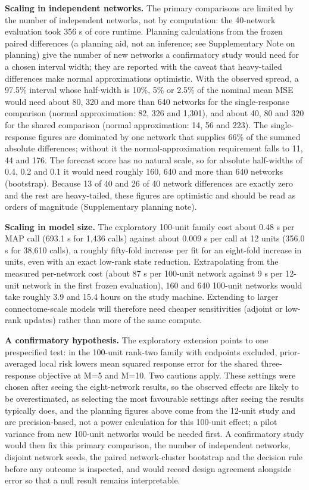 \textbf{Scaling in independent networks.} The primary comparisons are limited by the number of independent networks, not by computation: the 40-network evaluation took 356 s of core runtime. Planning calculations from the frozen paired differences (a planning aid, not an inference; see Supplementary Note on planning) give the number of new networks a confirmatory study would need for a chosen interval width; they are reported with the caveat that heavy-tailed differences make normal approximations optimistic. With the observed spread, a 97.5\% interval whose half-width is 10\%, 5\% or 2.5\% of the nominal mean MSE would need about 80, 320 and more than 640 networks for the single-response comparison (normal approximation: 82, 326 and 1,301), and about 40, 80 and 320 for the shared comparison (normal approximation: 14, 56 and 223). The single-response figures are dominated by one network that supplies 66\% of the summed absolute differences; without it the normal-approximation requirement falls to 11, 44 and 176. The forecast score has no natural scale, so for absolute half-widths of 0.4, 0.2 and 0.1 it would need roughly 160, 640 and more than 640 networks (bootstrap). Because 13 of 40 and 26 of 40 network differences are exactly zero and the rest are heavy-tailed, these figures are optimistic and should be read as orders of magnitude (Supplementary planning note).

\textbf{Scaling in model size.} The exploratory 100-unit family cost about 0.48 s per MAP call (693.1 s for 1,436 calls) against about 0.009 s per call at 12 units (356.0 s for 38,610 calls), a roughly fifty-fold increase per fit for an eight-fold increase in units, even with an exact low-rank state reduction. Extrapolating from the measured per-network cost (about 87 s per 100-unit network against 9 s per 12-unit network in the first frozen evaluation), 160 and 640 100-unit networks would take roughly 3.9 and 15.4 hours on the study machine. Extending to larger connectome-scale models will therefore need cheaper sensitivities (adjoint or low-rank updates) rather than more of the same compute.

\textbf{A confirmatory hypothesis.} The exploratory extension points to one prespecified test: in the 100-unit rank-two family with endpoints excluded, prior-averaged local risk lowers mean squared response error for the shared three-response objective at M=5 and M=10. Two cautions apply. These settings were chosen after seeing the eight-network results, so the observed effects are likely to be overestimated, as selecting the most favourable settings after seeing the results typically does, and the planning figures above come from the 12-unit study and are precision-based, not a power calculation for this 100-unit effect; a pilot variance from new 100-unit networks would be needed first. A confirmatory study would then fix this primary comparison, the number of independent networks, disjoint network seeds, the paired network-cluster bootstrap and the decision rule before any outcome is inspected, and would record design agreement alongside error so that a null result remains interpretable.

